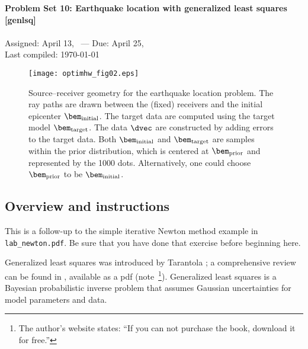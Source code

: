 \documentclass[11pt,titlepage,fleqn]{article}
\begin{document}

\begin{spacing}{1.2}
\centering
{\large \bf Problem Set 10: Earthquake location with generalized least squares [genlsq]} \\
\cltag\ \\
Assigned: April 13, \cyear\ --- Due: April 25, \cyear\ \\
Last compiled: \today
\end{spacing}


\vspace{1cm}
\begin{figure}[h]
\centering
\texttt{[image: optimhw\_fig02.eps]}
\caption[Source-receiver geometry]
{{
Source--receiver geometry for the earthquake location problem. The ray paths are drawn between the (fixed) receivers and the initial epicenter $\bem_{\rm initial}$.
The target data are computed using the target model \textcolor{red}{$\bem_{\rm target}$}.
The data $\dvec$ are constructed by adding errors to the target data.
Both $\bem_{\rm initial}$ and $\bem_{\rm target}$ are samples within the prior distribution, which is centered at \textcolor{blue}{$\bem_{\rm prior}$} and represented by the 1000 dots. Alternatively, one could choose \textcolor{blue}{$\bem_{\rm prior}$} to be $\bem_{\rm initial}$.
\label{fig:srcrec}
}}
\end{figure}


\pagebreak
\subsection*{Overview and instructions}

This is a follow-up to the simple iterative Newton method example in \verb+lab_newton.pdf+. Be sure that you have done that exercise before beginning here.

Generalized least squares was introduced by Tarantola \citep{TarantolaValette1982quest,TarantolaValette1982nonlinear}; a comprehensive review can be found in \citet{Tarantola2005}, available as a pdf (note~\footnote{The author's website states: ``If you can not purchase the book, download it for free.''}). Generalized least squares is a Bayesian probabilistic inverse problem that assumes Gaussian uncertainties for model parameters and data.
\end{document}
